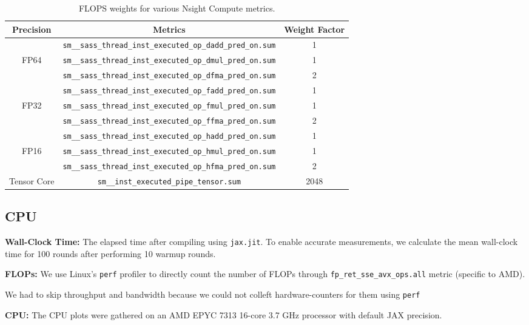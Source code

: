 \begin{table}[h]
\centering
\begin{tabular}{ccc}
\toprule
Precision & Metrics & Weight Factor \\
\midrule 
& \texttt{sm\_\_sass\_thread\_inst\_executed\_op\_dadd\_pred\_on.sum} & 1 \\
FP64 & \texttt{sm\_\_sass\_thread\_inst\_executed\_op\_dmul\_pred\_on.sum} & 1 \\
& \texttt{sm\_\_sass\_thread\_inst\_executed\_op\_dfma\_pred\_on.sum} & 2 \\
\midrule
& \texttt{sm\_\_sass\_thread\_inst\_executed\_op\_fadd\_pred\_on.sum} & 1 \\
FP32 & \texttt{sm\_\_sass\_thread\_inst\_executed\_op\_fmul\_pred\_on.sum} & 1 \\
& \texttt{sm\_\_sass\_thread\_inst\_executed\_op\_ffma\_pred\_on.sum} & 2 \\
\midrule
& \texttt{sm\_\_sass\_thread\_inst\_executed\_op\_hadd\_pred\_on.sum} & 1 \\
FP16 & \texttt{sm\_\_sass\_thread\_inst\_executed\_op\_hmul\_pred\_on.sum} & 1 \\
& \texttt{sm\_\_sass\_thread\_inst\_executed\_op\_hfma\_pred\_on.sum} & 2 \\
\midrule
Tensor Core & \texttt{sm\_\_inst\_executed\_pipe\_tensor.sum} & 2048 \\
\bottomrule
\end{tabular}
\caption{FLOPS weights for various Nsight Compute metrics.}
\label{tab:gpu-flops}
\end{table}

\subsection{CPU}

\textbf{Wall-Clock Time:} The elapsed time after compiling using \texttt{jax.jit}. To enable accurate measurements, we calculate the mean wall-clock time for 100 rounds after performing 10 warmup rounds.

\textbf{FLOPs:} We use Linux's \texttt{perf} profiler to directly count the number of FLOPs through \texttt{fp\_ret\_sse\_avx\_ops.all} metric (specific to AMD).

We had to skip throughput and bandwidth because we could not colleft hardware-counters for them using \texttt{perf}

\textbf{CPU:} The CPU plots were gathered on an AMD EPYC 7313 16-core 3.7 GHz processor with default JAX precision.